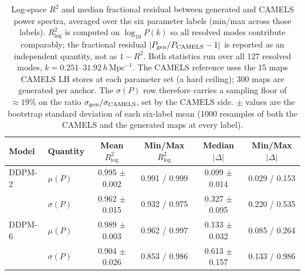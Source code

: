 \begin{table}[htbp]
    \centering
    \caption{Log-space $R^2$ and median fractional residual between generated and CAMELS
    power spectra, averaged over the six parameter labels (min/max across those labels).
    $R^2_{\log}$ is computed on $\log_{10} P(k)$ so all resolved modes contribute
    comparably; the fractional residual $|P_{\rm gen}/P_{\rm CAMELS} - 1|$ is reported as
    an independent quantity, not as $1 - R^2$. Both statistics run over all 127 resolved modes, $k = 0.251$--$31.92\,h\,\mathrm{Mpc}^{-1}$. The CAMELS reference uses the 15 maps CAMELS LH stores at each parameter set (a hard ceiling); 300 maps are generated per anchor. The $\sigma(P)$ row therefore carries a sampling floor of $\approx19\%$ on the ratio $\sigma_{\rm gen}/\sigma_{\rm CAMELS}$, set by the CAMELS side. $\pm$ values are the bootstrap standard deviation of each six-label mean (1000 resamples of both the CAMELS and the generated maps at every label).}
    \label{tab:r2_metrics}
    \begin{tabular}{llcccc}
        \toprule
        Model & Quantity & Mean $R^2_{\log}$ & Min/Max $R^2_{\log}$ & Median $|\Delta|$ & Min/Max $|\Delta|$ \\
        \midrule
        DDPM-2  & $\mu(P)$     & 0.995 $\pm$ 0.002 & 0.991 / 0.999 & 0.099 $\pm$ 0.014 & 0.029 / 0.153 \\
                & $\sigma(P)$  & 0.962 $\pm$ 0.015 & 0.932 / 0.975 & 0.327 $\pm$ 0.095 & 0.220 / 0.535 \\
        \midrule
        DDPM-6  & $\mu(P)$     & 0.989 $\pm$ 0.003 & 0.962 / 0.997 & 0.133 $\pm$ 0.032 & 0.085 / 0.264 \\
                & $\sigma(P)$  & 0.904 $\pm$ 0.026 & 0.853 / 0.986 & 0.613 $\pm$ 0.157 & 0.133 / 0.986 \\
        \bottomrule
    \end{tabular}
\end{table}
